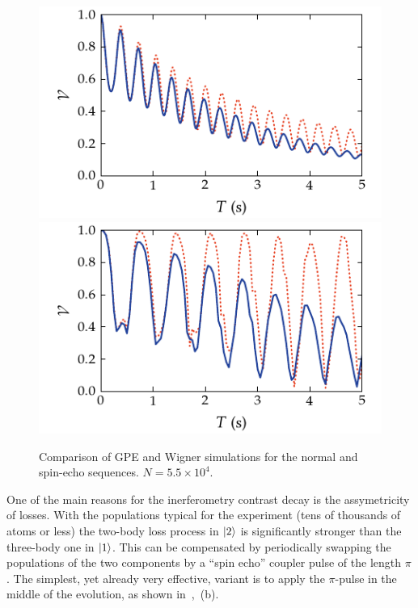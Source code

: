 \begin{figure}
    \centerline{%
    \includegraphics{figures_generated/bec_noise/ramsey_visibility_long.pdf}%
    \includegraphics{figures_generated/bec_noise/echo_visibility_long.pdf}}

    \caption{
    Comparison of GPE and Wigner simulations for the normal and spin-echo sequences.
    $N = 5.5 \times 10^4$.}

    \label{fig:bec-noise:visibility:visibility-long}
\end{figure}

One of the main reasons for the inerferometry contrast decay is the assymetricity of losses.
With the populations typical for the experiment (tens of thousands of atoms or less) the two-body loss process in $\mbox{\ensuremath{\vert 2 \rangle}}$ is significantly stronger than the three-body one in $\mbox{\ensuremath{\vert 1 \rangle}}$.
This can be compensated by periodically swapping the populations of the two components by a ``spin echo'' coupler pulse of the length $\pi$.
The simplest, yet already very effective, variant is to apply the $\pi$-pulse in the middle of the evolution, as shown in~,~(b).


